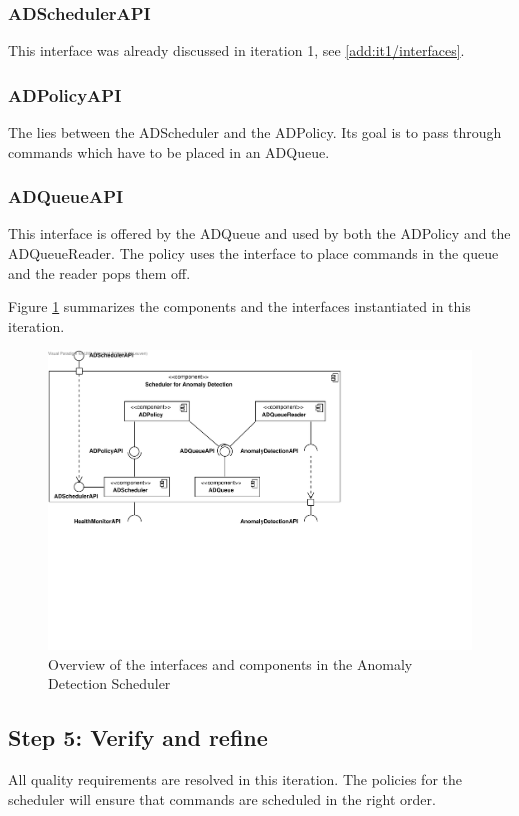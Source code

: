 \subsubsection{ADSchedulerAPI}

\npar This interface was already discussed in iteration 1, see
\ref{add:it1/interfaces}.

\subsubsection{ADPolicyAPI}

\npar The  lies between the ADScheduler and the ADPolicy.
Its goal is to pass through commands which have to be placed in an ADQueue.

\subsubsection{ADQueueAPI}

\npar This interface is offered by the ADQueue and used by both the ADPolicy and
the ADQueueReader. The policy uses the interface to place commands in the queue
and the reader pops them off.

\npar Figure \ref{fig:it5/interfaces} summarizes the components and the
interfaces instantiated in this iteration.

\begin{figure}[H]
	\begin{centering}
		\includegraphics[width=\textwidth]{figs/add-it5-interfaces.pdf}
		\caption{Overview of the interfaces and components in the Anomaly Detection
		Scheduler}
		\label{fig:it5/interfaces}
	\end{centering}
\end{figure}

\subsection{Step 5: Verify and refine}
\label{add:it5/verification}

\npar All quality requirements are resolved in this iteration. The policies for
the scheduler will ensure that commands are scheduled in the right order. 
